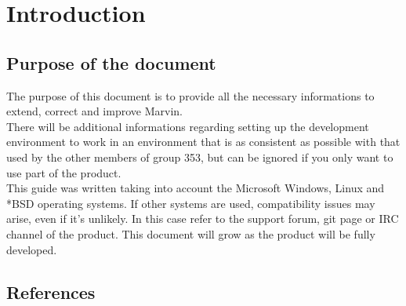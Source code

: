 \documentclass[ManualeSviluppatore]{subfiles}
\begin{document}
\chapter{Introduction}

	\section{Purpose of the document}
	The purpose of this document is to provide all the necessary informations to extend, correct and improve Marvin. \\
	There will be additional informations regarding setting up the development environment to work in an environment that is as consistent as possible with that used by the other members of group 353, but can be ignored if you only want to use part of the product. \\
	This guide was written taking into account the Microsoft Windows, Linux and *BSD operating systems. If other systems are used, compatibility issues may arise, even if it's unlikely. In this case refer to the support forum, git page or IRC channel of the product.
	This document will grow as the product will be fully developed.
	
	\scopoProdottoEN
	
	\section{References}
\end{document}
